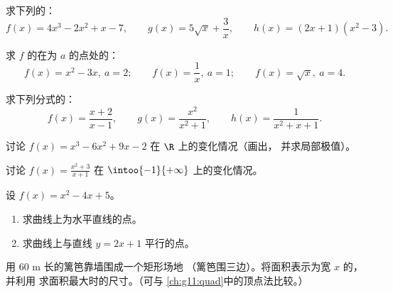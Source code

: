 \begin{exercise}[$\star$]\label{exo:g11:deriv:2}
求下列的：
\[
f(x) = 4x^3 - 2x^2 + x - 7, \qquad
g(x) = 5\sqrt{x} + \frac{3}{x}, \qquad
h(x) = (2x+1)(x^2 - 3) .
\]
\end{exercise}

\begin{exercise}[$\star$]\label{exo:g11:deriv:3}
求 $f$ 的在为
$a$ 的点处的：
\[
f(x) = x^2 - 3x, \ a = 2; \qquad
f(x) = \frac1x, \ a = 1; \qquad
f(x) = \sqrt x, \ a = 4 .
\]
\end{exercise}

\begin{exercise}[$\star$]\label{exo:g11:deriv:4}
求下列分式的：
\[
f(x) = \frac{x+2}{x-1}, \qquad
g(x) = \frac{x^2}{x^2+1}, \qquad
h(x) = \frac{1}{x^2 + x + 1} .
\]
\end{exercise}

\begin{exercise}[$\star\star$]\label{exo:g11:deriv:5}
讨论 $f(x) = x^3 - 6x^2 + 9x - 2$ 在 $\R$ 上的变化情况（画出，
并求局部极值）。
\end{exercise}

\begin{exercise}[$\star\star$]\label{exo:g11:deriv:6}
讨论 $f(x) = \frac{x^2 + 3}{x + 1}$ 在
$\intoo{-1}{+\infty}$ 上的变化情况。
\end{exercise}

\begin{exercise}[$\star\star$]\label{exo:g11:deriv:7}
设 $f(x) = x^2 - 4x + 5$。
\begin{enumerate}
  \item 求曲线上为水平直线的点。
  \item 求曲线上与直线
        $y = 2x + 1$ 平行的点。
\end{enumerate}
\end{exercise}

\begin{exercise}[$\star\star$]\label{exo:g11:deriv:8}
用 $60$ m 长的篱笆靠墙围成一个矩形场地
（篱笆围三边）。将面积表示为宽 $x$ 的，并利用
求面积最大时的尺寸。（可与
\cref{ch:g11:quad}中的顶点法比较。）
\end{exercise}


